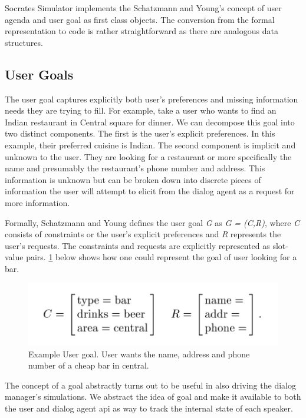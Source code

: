 Socrates Simulator implements the Schatzmann and Young's concept of user agenda and user goal as first class objects. The conversion from the formal representation to code is rather straightforward as there are analogous data structures. 

\subsection{User Goals} 
The user goal captures explicitly both user's preferences and missing information needs they are trying to fill. For example, take a user who wants to find an Indian restaurant in Central square for dinner. We can decompose this goal into two distinct components. The first is the user's explicit preferences. In this example, their preferred cuisine is Indian. The second component is implicit and unknown to the user. They are looking for a restaurant or more specifically the name and presumably the restaurant's phone number and address. This information is unknown but can be broken down into discrete pieces of information the user will attempt to elicit from the dialog agent as a request for more information. 

Formally, Schatzmann and Young defines the user goal \textit{G} as \textit{G = (C,R)}, where \textit{C} consists of constraints or the user's explicit preferences and \textit{R} represents the user's requests. The constraints and requests are explicitly represented as slot-value pairs. \ref{fig:goals1} below shows how one could represent the goal of user looking for a bar. 

\begin{figure}[h!]
	\includegraphics[scale=.35]{diagrams/schatzmann_goal_fig.jpeg}
	\caption{Example User goal. User wants the name, address and phone number of a cheap bar in central.  }
	\label{fig:goals1}
\end{figure}

The concept of a goal abstractly turns out to be useful in also driving the dialog manager's simulations. We abstract the idea of goal and make it available to both the user and dialog agent api as way to track the internal state of each speaker. 

